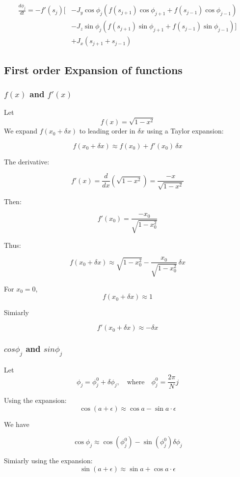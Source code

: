\documentclass{article}
\begin{document}
\begin{align*}
    \frac{d\phi_j}{dt} = -f'(s_j)[&-J_y\cos\phi_j(f(s_{j+1})\cos\phi_{j+1} + f(s_{j-1})\cos\phi_{j-1}) \\
                                  &-J_z\sin\phi_j(f(s_{j+1})\sin\phi_{j+1} + f(s_{j-1})\sin\phi_{j-1})] \\
                                  &+J_x(s_{j+1} + s_{j-1})
\end{align*}

\subsection{First order Expansion of functions}
\subsubsection{$f(x)$ and $f'(x)$}
Let 
\[
f(x) = \sqrt{1 - x^2}
\]
We expand \( f(x_0 + \delta x) \) to leading order in \( \delta x \) using a Taylor expansion:

\[
f(x_0 + \delta x) \approx f(x_0) + f'(x_0) \, \delta x
\]

The derivative:

\[
f'(x) = \frac{d}{dx} \left( \sqrt{1 - x^2} \right) = \frac{-x}{\sqrt{1 - x^2}}
\]

Then:

\[
f'(x_0) = \frac{-x_0}{\sqrt{1 - x_0^2}}
\]

Thus:

\[
f(x_0 + \delta x) \approx \sqrt{1 - x_0^2} - \frac{x_0}{\sqrt{1 - x_0^2}} \, \delta x
\]

For $x_0 = 0$, \[\boxed{f(x_0 + \delta x) \approx 1}\]

Simiarly

\[\boxed{f'(x_0 + \delta x) \approx -\delta x}\]

\subsubsection{$cos\phi_j$ and $sin\phi_j$}

Let
\[
\phi_j = \phi_j^0 + \delta \phi_j, \quad \text{where} \quad \phi_j^0 = \frac{2\pi}{N} j
\]

Using the expansion:
\[
\cos(a + \epsilon) \approx \cos a - \sin a \cdot \epsilon
\]

We have 

\[
\boxed{
\cos\phi_j \approx \cos(\phi_j^0) - \sin(\phi_j^0)\delta\phi_j
}
\]

Simiarly using the expansion:
\[
\sin(a + \epsilon) \approx \sin a + \cos a \cdot \epsilon
\]
\end{document}
